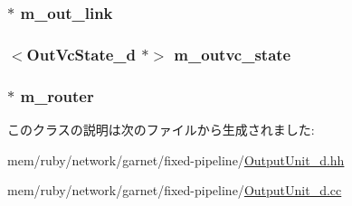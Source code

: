 \label{classOutputUnit__d_a41dd924ecf4c977d4f4e5251e8076a0e}
\hypertarget{classOutputUnit__d_ad6b6f290562e57546ef09c211721a199}{
\subsubsection[{m\_\-out\_\-link}]{$\ast$ {\bf m\_\-out\_\-link}}}
\label{classOutputUnit__d_ad6b6f290562e57546ef09c211721a199}
\hypertarget{classOutputUnit__d_ae14b2f87437379bc1ab5b4cc523e1406}{
\subsubsection[{m\_\-outvc\_\-state}]{$<${\bf OutVcState\_\-d} $\ast$$>$ {\bf m\_\-outvc\_\-state}}}
\label{classOutputUnit__d_ae14b2f87437379bc1ab5b4cc523e1406}
\hypertarget{classOutputUnit__d_a81d53a65b375007289068e764da769d8}{
\subsubsection[{m\_\-router}]{$\ast$ {\bf m\_\-router}}}
\label{classOutputUnit__d_a81d53a65b375007289068e764da769d8}


このクラスの説明は次のファイルから生成されました:\begin{DoxyCompactItemize}
\item 
mem/ruby/network/garnet/fixed-\/pipeline/\hyperlink{OutputUnit__d_8hh}{OutputUnit\_\-d.hh}\item 
mem/ruby/network/garnet/fixed-\/pipeline/\hyperlink{OutputUnit__d_8cc}{OutputUnit\_\-d.cc}\end{DoxyCompactItemize}
